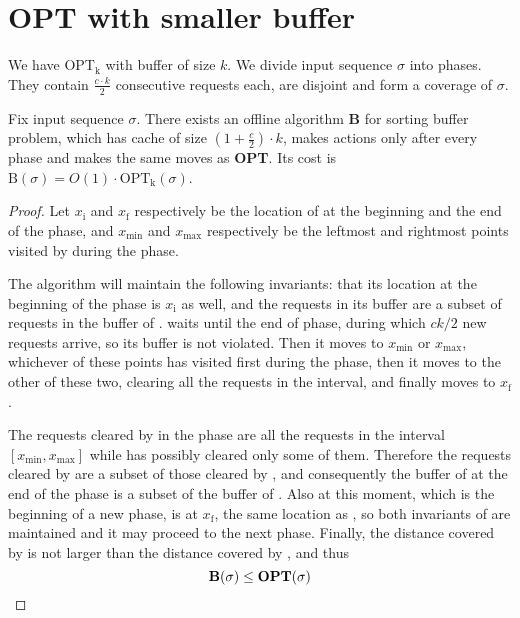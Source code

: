 \section{OPT with smaller buffer}
We have $\mathrm{OPT_k}$ with buffer of size $k$. We divide input sequence 
$\sigma$ into phases. They 
contain $\frac{c \cdot k}{2}$ consecutive requests each, are disjoint and form 
a 
coverage of $\sigma$.
\begin{lemma}
Fix input sequence $\sigma$. There exists an offline algorithm \textbf{B} 
for sorting buffer problem, which has cache of size $(1 + 
\frac{c}{2}) \cdot k$, makes actions only after every phase and makes the same 
moves as \textbf{OPT}. Its cost is $\mathrm{B}(\sigma) = O(1) \cdot 
\mathrm{OPT_k}(\sigma)$.
\label{lem:algorithm_B}
\end{lemma}
\begin{proof}
 Let $x_\text{i}$ and $x_\text{f}$ respectively be the location of \opt{} at 
the 
beginning and the end of the phase, and $x_\text{min}$ and $x_\text{max}$ 
respectively be the leftmost and rightmost points visited by \opt{} during the 
phase.

The algorithm \fazowy{} will maintain the following invariants: that its 
location at the beginning of the phase is $x_\text{i}$ as well, and the 
requests in its buffer are a subset of requests in the buffer of \opt. 
\fazowy{} waits until the end of phase, during which $ck/2$ new requests 
arrive, so its buffer is not violated. Then it moves to $x_\text{min}$ or 
$x_\text{max}$, whichever of these points \opt{} has visited first during the 
phase, then it moves to the other of these two, clearing all the requests in 
the interval, and finally moves to $x_\text{f}$.

The requests cleared by \fazowy{} in the phase are all the requests in the 
interval $[x_\text{min},x_\text{max}]$ while \opt{} has possibly cleared only 
some of them.
Therefore the requests cleared by \opt{} are a subset of those cleared by 
\fazowy, and consequently the buffer of \fazowy{} at the end of the phase is a 
subset of the buffer of \opt. Also at this moment, which is the beginning of a 
new phase, \fazowy{} is at $x_\text{f}$, the same location as \opt, so both 
invariants of \fazowy{} are maintained and it may proceed to the next phase. 
Finally, the distance covered by \fazowy{} is not larger than the distance 
covered by \opt{}, and thus
\[ \operatorname{\textbf{B}}(\sigma) \leq \operatorname{\textbf{OPT}}(\sigma) \]
\end{proof}

